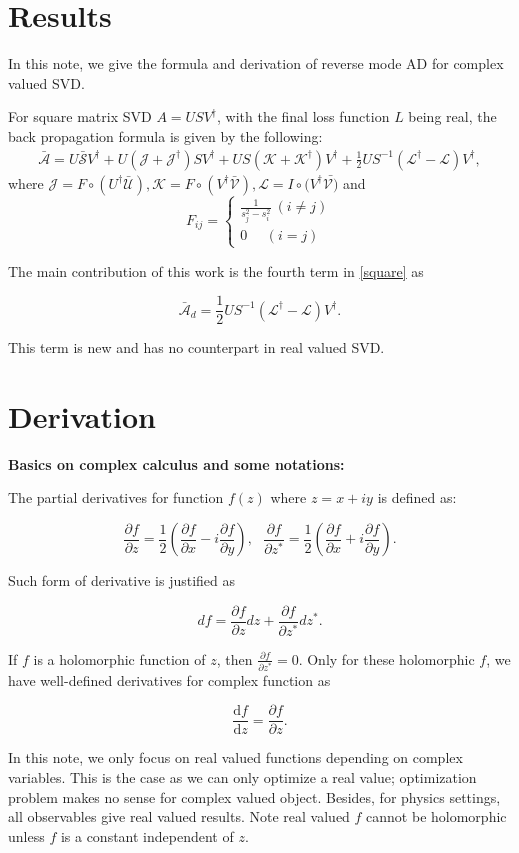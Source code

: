 \documentclass[aps,prl,singlecolumn,preprintnumbers,amsmath,amssymb,notitlepage]{revtex4-1}
\newcommand{\<}{\langle}
\renewcommand{\>}{\rangle}
\newcommand{\eq}[2]{
	\begin{equation}
	#1 \label{#2}
	\end{equation}
}
\newcommand{\pf}[2]{\frac{\partial #1}{\partial #2}}
\newcommand{\df}[2]{\frac{\mathrm{d} #1}{\mathrm{d} #2}}
\begin{document}
\section{Results}

In this note, we give the formula and derivation of reverse mode AD for complex valued SVD.

For square matrix SVD $A=USV^\dagger$, with the final loss function $L$ being real, the back propagation formula is given by the following:
\begin{align}
	\bar{\mathcal {A} }= U\bar{\mathcal{S}}V^\dagger+U(\mathcal{J}+\mathcal{J}^\dagger)SV^\dagger + US(\mathcal{K}+\mathcal{K}^\dagger) V^\dagger+\frac{1}{2}US^{-1}(\mathcal{L}^\dagger-\mathcal{L})V^\dagger,
	\label{square}
\end{align}
where $\mathcal{J}=F\circ (U^\dagger \bar{\mathcal{U}}), \mathcal{K}=F\circ (V^\dagger \bar{\mathcal{V}}), \mathcal{L}=I\circ (V^\dagger \bar{\mathcal{V})}$ and
$$
F_{ij}=\left\{ \begin{aligned}\frac{1}{s_j^2-s_i^2}~(i\neq j)\\0~~~~~~ (i=j)\end{aligned}\right . 
$$

The main contribution of this work is the fourth term in \eqref{square} as
\eq{\bar{\mathcal{A}}_d=\frac{1}{2}US^{-1}(\mathcal{L}^\dagger-\mathcal{L})V^\dagger.}{diagonal}

This term is new and has no counterpart in real valued SVD.


\section{Derivation}

{\bf Basics on complex calculus and some notations:}

The partial derivatives for function $f(z)$ where $z=x+iy$ is defined as:
\eq{\pf{f}{z}=\frac{1}{2}(\pf{f}{x}-i \pf{f}{y}), ~~~ \pf{f}{z^*}=\frac{1}{2}(\pf{f}{x}+i \pf{f}{y}).}{derivative}

Such form of derivative is justified as 
\eq{df=\pf{f}{z}dz+\pf{f}{z^*}dz^*.}{diff}

If $f$ is a holomorphic function of $z$, then $\pf{f}{z^*}=0$. Only for these holomorphic $f$, we have well-defined derivatives for complex function as 
\eq{\df{f}{z}=\pf{f}{z}.}{arg2}

In this note, we only focus on real valued functions depending on complex variables. This is the case as we can only optimize a real value; optimization problem makes no sense for complex valued object. Besides, for physics settings, all observables give real valued results. Note real valued $f$ cannot be holomorphic unless $f$ is a constant independent of $z$.
\end{document}
